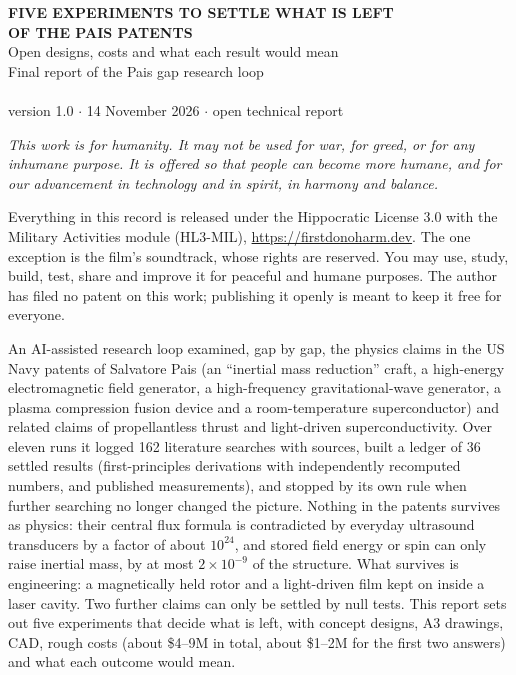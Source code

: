 \documentclass[10.5pt,a4paper]{article}
\newcommand{\e}[1]{\times10^{#1}}
\begin{document}
\begin{center}
{\LARGE\bfseries\color{ink} FIVE EXPERIMENTS TO SETTLE WHAT IS LEFT\\[3pt] OF THE PAIS PATENTS}\\[7pt]
{\ttfamily\color{slate} Open designs, costs and what each result would mean}\\[1pt]
{\ttfamily\color{slate} Final report of the Pais gap research loop}\\[10pt]
{\large\bfseries\color{ink} \AUTHOR}\\[3pt]
{\small\ttfamily\color{slate} version 1.0 $\cdot$ 14 November 2026 $\cdot$ open technical report}
\end{center}

\begin{tcolorbox}[colback=white,colframe=accent,coltitle=white,boxrule=0.7pt,arc=1.5pt,left=8pt,right=8pt,top=6pt,bottom=6pt,title={\small\bfseries PURPOSE AND LICENCE}]
\small
\emph{This work is for humanity. It may not be used for war, for greed, or for any inhumane purpose. It is offered so that people can become more humane, and for our advancement in technology and in spirit, in harmony and balance.}\par\smallskip
Everything in this record is released under the Hippocratic License 3.0 with the Military Activities module (HL3-MIL), \url{https://firstdonoharm.dev}. The one exception is the film's soundtrack, whose rights are reserved. You may use, study, build, test, share and improve it for peaceful and humane purposes. The author has filed no patent on this work; publishing it openly is meant to keep it free for everyone.
\end{tcolorbox}

An AI-assisted research loop examined, gap by gap, the physics claims in the US Navy patents of Salvatore Pais (an ``inertial mass reduction'' craft, a high-energy electromagnetic field generator, a high-frequency gravitational-wave generator, a plasma compression fusion device and a room-temperature superconductor) and related claims of propellantless thrust and light-driven superconductivity. Over eleven runs it logged 162 literature searches with sources, built a ledger of 36 settled results (first-principles derivations with independently recomputed numbers, and published measurements), and stopped by its own rule when further searching no longer changed the picture. Nothing in the patents survives as physics: their central flux formula is contradicted by everyday ultrasound transducers by a factor of about $10^{24}$, and stored field energy or spin can only raise inertial mass, by at most $2\e{-9}$ of the structure. What survives is engineering: a magnetically held rotor and a light-driven film kept on inside a laser cavity. Two further claims can only be settled by null tests. This report sets out five experiments that decide what is left, with concept designs, A3 drawings, CAD, rough costs (about \$4--9M in total, about \$1--2M for the first two answers) and what each outcome would mean.
\end{document}
